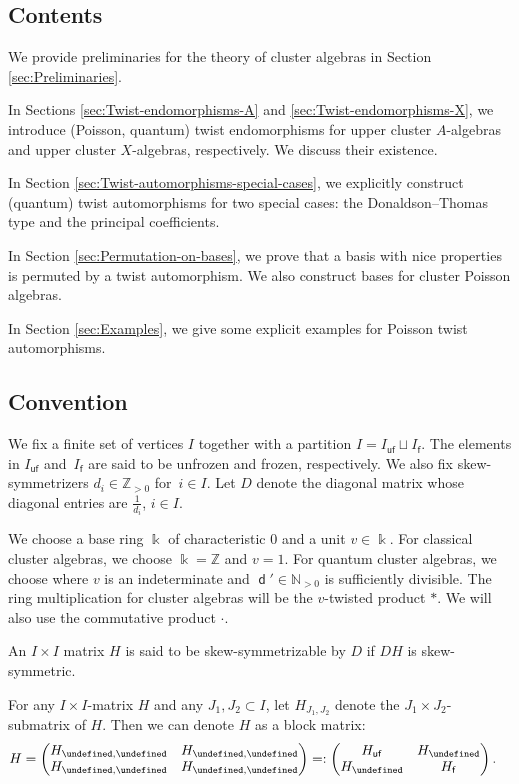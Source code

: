 \documentclass[10pt,a4paper]{amsart}
\newcommand{\kk}{\Bbbk}
\newcommand{\Z}{\mathbb{Z}}
\newcommand{\N}{\mathbb{N}}
\newcommand{\opname}[1]{\operatorname{\mathsf{#1}}}
\newcommand{\diag}{{\delta}}
\renewcommand{\diag}{{d}}
\newcommand{\Diag}{\opname{Diag}}
\newcommand{\fv}{\opname{f}}
\newcommand{\ufv}{\opname{uf}}
\let\Iufv\undefined
\let\Ifv\undefined
\let\high\undefined
\let\low\undefined
\newcommand{\Iufv}{I_{\ufv}}
\newcommand{\Ifv}{I_{\fv}}
\renewcommand{\diag}{\opname{d}'}
\renewcommand{\Diag}{D}
\newcommand{\high}{\opname{\ufv,\fv}}
\newcommand{\low}{\opname{\fv,\ufv}}
\numberwithin{equation}{section}
\begin{document}
\subsection{Contents}

We provide preliminaries for the theory of cluster algebras in Section
\ref{sec:Preliminaries}.

In Sections \ref{sec:Twist-endomorphisms-A} and \ref{sec:Twist-endomorphisms-X},
we introduce (Poisson, quantum) twist endomorphisms for upper cluster $A$-algebras
and upper cluster $X$-algebras, respectively. We discuss their existence.

In Section \ref{sec:Twist-automorphisms-special-cases}, we explicitly
construct (quantum) twist automorphisms for two special cases: the Donaldson--Thomas
type and the principal coefficients.

In Section \ref{sec:Permutation-on-bases}, we prove that a basis
with nice properties is permuted by a twist automorphism. We also construct bases for cluster Poisson algebras.

In Section \ref{sec:Examples}, we give some explicit examples for
Poisson twist automorphisms.

\subsection{Convention}

We fix a finite set of vertices $I$ together with a partition $I=I_{\ufv}\sqcup I_{\fv}$.
The elements in $I_{\ufv}$ and~$I_{\fv}$ are said to be unfrozen
and frozen, respectively. We also fix skew-symmetrizers $d_{i}\in\Z_{>0}$
for~$i\in I$. Let
$\Diag$ denote the diagonal matrix whose diagonal entries are $\frac{1}{d_{i}}$, $i\in I$.

We choose a base ring $\kk$ of characteristic
$0$ and a unit $v\in \kk$. For classical cluster algebras, we choose $\kk=\Z$ and $v=1$. For quantum cluster algebras, we choose \smash{$\kk=\Z\big[v^{\pm\frac{1}{\diag}}\big]$} where $v$ is an indeterminate and $\diag\in \N_{>0}$ is sufficiently divisible. The ring multiplication for cluster algebras will be the $v$-twisted product $*$. We will also use the commutative product $\cdot$.

An $I\times I$ matrix $H$ is said to be skew-symmetrizable by $\Diag$
if $\Diag H$ is skew-symmetric.

For any $I\times I$-matrix $H$ and any $J_{1},J_{2}\subset I$,
let $H_{J_{1},J_{2}}$ denote the $J_{1}\times J_{2}$-submatrix of
$H$. Then we can denote $H$ as a block matrix:
\begin{align*}
H & =\left(\begin{matrix}
H_{\Iufv,\Iufv} & H_{\Iufv,\Ifv}\\
H_{\Ifv,\Iufv} & H_{\Ifv,\Ifv}
\end{matrix}\right)=:\left(\begin{matrix}
H_{\ufv} & H_{\high}\\
H_{\low} & H_{\fv}
\end{matrix}\right).
\end{align*}
\end{document}
